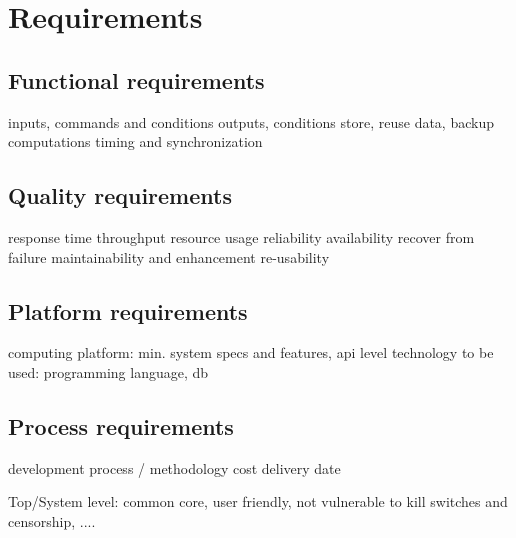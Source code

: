 \section{Requirements} %

\subsection{Functional requirements} %

inputs, commands and conditions
outputs, conditions
store, reuse data, backup
computations
timing and synchronization

\subsection{Quality requirements}

response time
throughput
resource usage
reliability
availability
recover from failure
maintainability and enhancement
re-usability

\subsection{Platform requirements}

computing platform: min. system specs and features, api level
technology to be used: programming language, db

\subsection{Process requirements}

development process / methodology
cost
delivery date






Top/System level: common core, user friendly, not vulnerable to kill switches and censorship, ....


